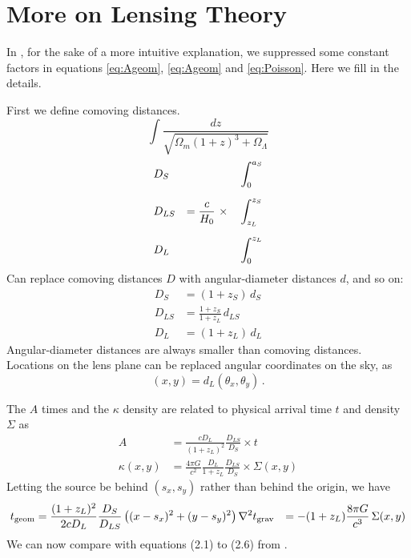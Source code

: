 \appendix

\section{More on Lensing Theory} \label{sec:more-theory}

In , for the sake of a more intuitive
explanation, we suppressed some constant factors in
equations \eqref{eq:Ageom}, \eqref{eq:Ageom} and \eqref{eq:Poisson}.
Here we fill in the details.

First we define comoving distances.
\begin{equation}
\int \frac{dz}{\sqrt{\Omega_m(1+z)^3 + \Omega_\Lambda}}
\end{equation}
\begin{equation}
\begin{aligned}
&D_S    &                                &\int_0^{a_S} \\
\noalign{\medskip}
&D_{LS} & = \frac c{H_0} \ \times \quad  &\int_{z_L}^{z_S} \\
\noalign{\medskip}
&D_L    &                                &\int_0^{z_L}
\end{aligned}
\end{equation}
Can replace comoving distances $D$ with angular-diameter distances
$d$, and so on:
\begin{equation}
\begin{aligned}
D_S &= (1+z_S) \, d_S \\
D_{LS} &= \frac{1+z_S}{1+z_L} \, d_{LS} \\
D_L &= (1+z_L) \, d_L
\end{aligned}
\end{equation}
Angular-diameter distances are always smaller than comoving distances.
Locations on the lens plane can be replaced angular coordinates on the
sky, as
\begin{equation}
(x,y) = d_L (\theta_x,\theta_y) \,.
\end{equation}

The $A$ times and the $\kappa$ density are related to physical arrival
time $t$ and density $\Sigma$ as
\begin{equation}
\begin{aligned}
A           &= \frac{cD_L}{(1+z_L)^2} \frac{D_{LS}}{D_S} \times t \\
\kappa(x,y) &= \frac{4\pi G}{c^2} \frac{D_L}{1+z_L} \frac{D_{LS}}{D_S}
               \times \Sigma(x,y)
\end{aligned}
\end{equation}
Letting the source be behind $(s_x,s_y)$ rather than behind the
origin, we have
\begin{equation}
\begin{aligned}
t_{\rm geom} &= \frac{(1+z_L)^2}{2cD_L} \frac{D_S}{D_{LS}}
\left( (x-s_x)^2 + (y-s_y)^2 \right)
\nabla^2 t_{\rm grav} &= -(1+z_L)\frac{8\pi G}{c^3} \, \Sigma(x,y)
\end{aligned}
\end{equation}
We can now compare with equations (2.1) to (2.6)
from \cite{1986ApJ...310..568B}.

